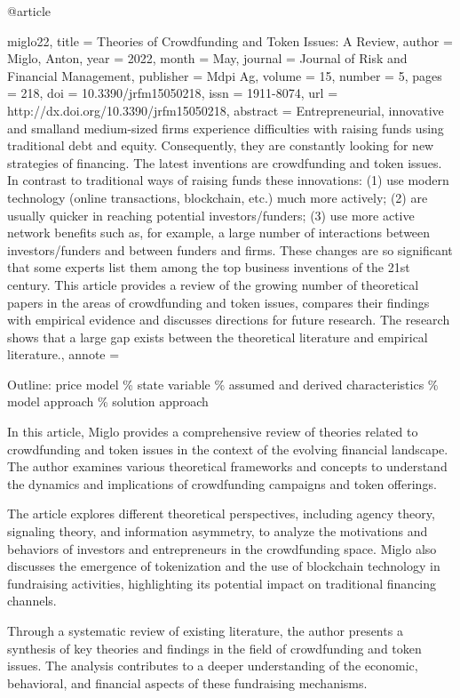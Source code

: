 @article{miglo22,
       title    = {Theories of Crowdfunding and Token Issues: A Review},
       author   = {Miglo, Anton},
       year     = 2022,
       month    = {May},
       journal  = {Journal of Risk and Financial Management},
       publisher = {Mdpi Ag},
       volume   = 15,
       number   = 5,
       pages    = 218,
       doi      = {10.3390/jrfm15050218},
       issn     = {1911-8074},
       url      = {http://dx.doi.org/10.3390/jrfm15050218},
       abstract = {Entrepreneurial, innovative and smalland medium-sized firms experience difficulties with raising funds using traditional debt and equity. Consequently, they are constantly looking for new strategies of financing. The latest inventions are crowdfunding and token issues. In contrast to traditional ways of raising funds these innovations: (1) use modern technology (online transactions, blockchain, etc.) much more actively; (2) are usually quicker in reaching potential investors/funders; (3) use more active network benefits such as, for example, a large number of interactions between investors/funders and between funders and firms. These changes are so significant that some experts list them among the top business inventions of the 21st century. This article provides a review of the growing number of theoretical papers in the areas of crowdfunding and token issues, compares their findings with empirical evidence and discusses directions for future research. The research shows that a large gap exists between the theoretical literature and empirical literature.},
       annote   = {
        Outline: price model \% state variable \% assumed and derived characteristics \% model approach \% solution approach

        In this article, Miglo provides a comprehensive review of theories related to crowdfunding and token issues in the context of the evolving financial landscape. The author examines various theoretical frameworks and concepts to understand the dynamics and implications of crowdfunding campaigns and token offerings.

        The article explores different theoretical perspectives, including agency theory, signaling theory, and information asymmetry, to analyze the motivations and behaviors of investors and entrepreneurs in the crowdfunding space. Miglo also discusses the emergence of tokenization and the use of blockchain technology in fundraising activities, highlighting its potential impact on traditional financing channels.

        Through a systematic review of existing literature, the author presents a synthesis of key theories and findings in the field of crowdfunding and token issues. The analysis contributes to a deeper understanding of the economic, behavioral, and financial aspects of these fundraising mechanisms.

}}
